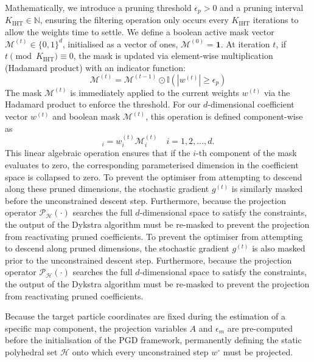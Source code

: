Mathematically, we introduce a pruning threshold $\epsilon_p > 0$ and a pruning interval $K_{\mathrm{IHT}} \in \mathbb{N}$, ensuring the filtering operation only occurs every $K_{\mathrm{IHT}}$ iterations to allow the weights time to settle. We define a boolean active mask vector $\mathcal{M}^{(t)} \in \{0, 1\}^d$, initialised as a vector of ones, $\mathcal{M}^{(0)} = \mathbf{1}$. At iteration $t$, if $t \pmod {K_{\mathrm{IHT}}} \equiv 0$, the mask is updated via element-wise multiplication (Hadamard product) with an indicator function:
\begin{equation*}
    \mathcal{M}^{(t)} = \mathcal{M}^{(t-1)} \odot \mathbb{I}(|w^{(t)}| \ge \epsilon_p)
\end{equation*}
The mask $\mathcal{M}^{(t)}$ is immediately applied to the current weights $w^{(t)}$ via the Hadamard product to enforce the threshold. For our $d$-dimensional coefficient vector $w^{(t)}$ and boolean mask $\mathcal{M}^{(t)}$, this operation is defined component-wise as
\begin{equation*}
    [w^{(t)} \odot \mathcal{M}^{(t)}]_i = w_i^{(t)} \mathcal{M}_i^{(t)} \quad i = 1, 2, \dots, d.
\end{equation*}
This linear algebraic operation ensures that if the $i$-th component of the mask evaluates to zero, the corresponding parameterised dimension in the coefficient space is collapsed to zero. To prevent the optimiser from attempting to descend along these pruned dimensions, the stochastic gradient $g^{(t)}$ is similarly masked before the unconstrained descent step. Furthermore, because the projection operator $\mathcal{P}_{\mathcal{H}}(\cdot)$ searches the full $d$-dimensional space to satisfy the constraints, the output of the Dykstra algorithm must be re-masked to prevent the projection from reactivating pruned coefficients.
To prevent the optimiser from attempting to descend along pruned dimensions, the stochastic gradient $g^{(t)}$ is also masked prior to the unconstrained descent step. Furthermore, because the projection operator $\mathcal{P}_{\mathcal{H}}(\cdot)$ searches the full $d$-dimensional space to satisfy the constraints, the output of the Dykstra algorithm must be re-masked to prevent the projection from reactivating pruned coefficients.

Because the target particle coordinates are fixed during the estimation of a specific map component, the projection variables $A$ and $\epsilon_m$ are pre-computed before the initialisation of the PGD framework, permanently defining the static polyhedral set $\mathcal{H}$ onto which every unconstrained step $w^\circ$ must be projected.


